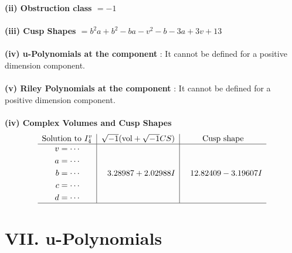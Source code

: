 \documentclass[1p]{elsarticle_modified}
\theoremstyle{definition}
\newcommand{\I}{\sqrt{-1}}
\begin{document}
\flushleft \textbf{(ii) Obstruction class $= -1$}\\~\\
\flushleft \textbf{(iii) Cusp Shapes $= b^2 a+b^2- b a- v^2- b-3 a+3 v+13$}\\~\\
\flushleft \textbf{(iv) u-Polynomials at the component} : It cannot be defined for a positive dimension component.\\~\\
\flushleft \textbf{(v) Riley Polynomials at the component} : It cannot be defined for a positive dimension component.\\~\\
\newpage\flushleft \textbf{(iv) Complex Volumes and Cusp Shapes}
$$\begin{array}{c|c|c} 
\text{Solution to }I^v_{4}& \I (\text{vol} + \sqrt{-1}CS) & \text{Cusp shape}\\
 \hline 
\begin{aligned}
v &= \cdots \\
a &= \cdots \\
b &= \cdots \\
c &= \cdots \\
d &= \cdots\end{aligned}
 & \phantom{-}3.28987 + 2.02988 I & \phantom{-}12.82409 - 3.19607 I\\
 \hline 
 \end{array}
$$
\newpage\renewcommand{\arraystretch}{1}
\centering \section*{ VII. u-Polynomials}
\end{document}
